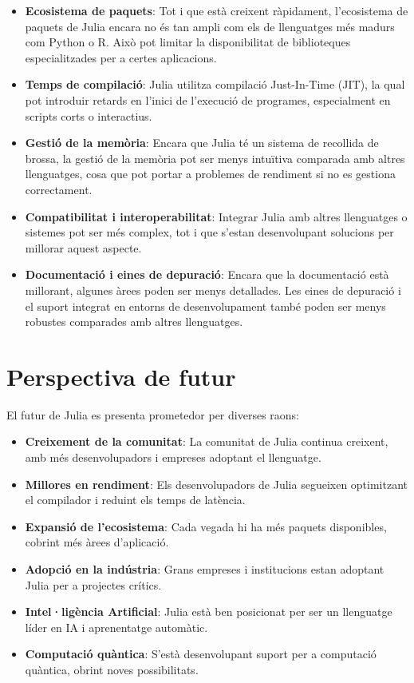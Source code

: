 \documentclass[a4paper]{article}
\begin{document}
\begin{itemize}
    \item \textbf{Ecosistema de paquets}: Tot i que està creixent ràpidament, l'ecosistema de paquets de Julia encara no és tan ampli com els de llenguatges més madurs com Python o R. Això pot limitar la disponibilitat de biblioteques especialitzades per a certes aplicacions.

    \item \textbf{Temps de compilació}: Julia utilitza compilació Just-In-Time (JIT), la qual pot introduir retards en l'inici de l'execució de programes, especialment en scripts corts o interactius.

    \item \textbf{Gestió de la memòria}: Encara que Julia té un sistema de recollida de brossa, la gestió de la memòria pot ser menys intuïtiva comparada amb altres llenguatges, cosa que pot portar a problemes de rendiment si no es gestiona correctament.

    \item \textbf{Compatibilitat i interoperabilitat}: Integrar Julia amb altres llenguatges o sistemes pot ser més complex, tot i que s'estan desenvolupant solucions per millorar aquest aspecte.

    \item \textbf{Documentació i eines de depuració}: Encara que la documentació està millorant, algunes àrees poden ser menys detallades. Les eines de depuració i el suport integrat en entorns de desenvolupament també poden ser menys robustes comparades amb altres llenguatges.
\end{itemize}

\section{Perspectiva de futur}
El futur de Julia es presenta prometedor per diverses raons:

\begin{itemize}
    \item \textbf{Creixement de la comunitat}: La comunitat de Julia continua creixent, amb més desenvolupadors i empreses adoptant el llenguatge.

    \item \textbf{Millores en rendiment}: Els desenvolupadors de Julia segueixen optimitzant el compilador i reduint els temps de latència.

    \item \textbf{Expansió de l'ecosistema}: Cada vegada hi ha més paquets disponibles, cobrint més àrees d'aplicació.

    \item \textbf{Adopció en la indústria}: Grans empreses i institucions estan adoptant Julia per a projectes crítics.

    \item \textbf{Intel·ligència Artificial}: Julia està ben posicionat per ser un llenguatge líder en IA i aprenentatge automàtic.

    \item \textbf{Computació quàntica}: S'està desenvolupant suport per a computació quàntica, obrint noves possibilitats.
\end{itemize}
\end{document}
